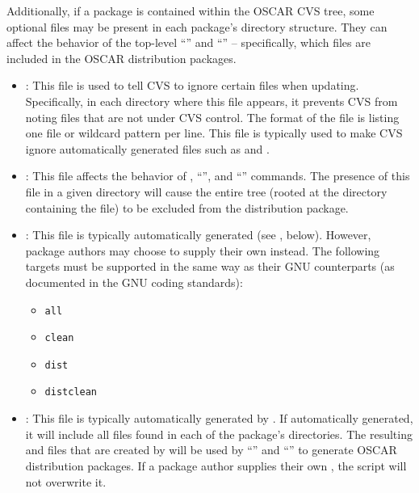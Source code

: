 \endchange

Additionally, if a package is contained within the OSCAR CVS tree,
some optional files may be present in each package's directory
structure.  They can affect the behavior of the top-level ``'' and ``'' -- specifically, which files
are included in the OSCAR distribution packages.

\begin{itemize}
\item {}: This file is used to tell CVS to ignore
  certain files when updating.  Specifically, in each directory where
  this file appears, it prevents CVS from noting files that are not
  under CVS control.  The format of the file is listing one file or
  wildcard pattern per line.  This file is typically used to make CVS
  ignore automatically generated files such as  and
  .
  
\item {}: This file affects the behavior of
  , ``'', and ``''
  commands.  The presence of this file in a given directory will cause
  the entire tree (rooted at the directory containing the
   file) to be excluded from the distribution
  package.
  
\item {}: This file is typically automatically generated
  (see , below).  However, package authors may
  choose to supply their own  instead.  The following
  targets must be supported in the same way as their GNU
   counterparts (as documented in the GNU coding
  standards):

  \begin{itemize}
  \item {\tt all}
  \item {\tt clean}
  \item {\tt dist}
  \item {\tt distclean}
  \end{itemize}
  
\item {}: This file is typically automatically
  generated by .  If automatically generated, it will
  include all files found in each of the package's directories.  The
  resulting  and  files that are
  created by  will be used by ``'' and
  ``'' to generate OSCAR distribution packages.
  If a package author supplies their own , the
   script will not overwrite it.
\end{itemize}

